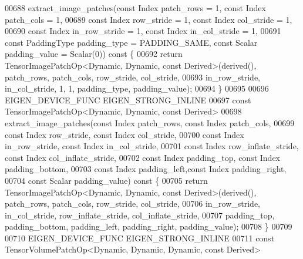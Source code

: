 \begin{DoxyCode}
00688     extract\_image\_patches(\textcolor{keyword}{const} Index patch\_rows = 1, \textcolor{keyword}{const} Index patch\_cols = 1,
00689                           \textcolor{keyword}{const} Index row\_stride = 1, \textcolor{keyword}{const} Index col\_stride = 1,
00690                           \textcolor{keyword}{const} Index in\_row\_stride = 1, \textcolor{keyword}{const} Index in\_col\_stride = 1,
00691                           \textcolor{keyword}{const} PaddingType padding\_type = PADDING\_SAME, \textcolor{keyword}{const} Scalar padding\_value = 
      Scalar(0))\textcolor{keyword}{ const }\{
00692       \textcolor{keywordflow}{return} TensorImagePatchOp<Dynamic, Dynamic, const Derived>(derived(), patch\_rows, patch\_cols, 
      row\_stride, col\_stride,
00693                                                                  in\_row\_stride, in\_col\_stride, 1, 1, 
      padding\_type, padding\_value);
00694     \}
00695 
00696     EIGEN\_DEVICE\_FUNC EIGEN\_STRONG\_INLINE
00697     \textcolor{keyword}{const} TensorImagePatchOp<Dynamic, Dynamic, const Derived>
00698     extract\_image\_patches(\textcolor{keyword}{const} Index patch\_rows, \textcolor{keyword}{const} Index patch\_cols,
00699                           \textcolor{keyword}{const} Index row\_stride, \textcolor{keyword}{const} Index col\_stride,
00700                           \textcolor{keyword}{const} Index in\_row\_stride, \textcolor{keyword}{const} Index in\_col\_stride,
00701                           \textcolor{keyword}{const} Index row\_inflate\_stride, \textcolor{keyword}{const} Index col\_inflate\_stride,
00702                           \textcolor{keyword}{const} Index padding\_top, \textcolor{keyword}{const} Index padding\_bottom,
00703                           \textcolor{keyword}{const} Index padding\_left,\textcolor{keyword}{const} Index padding\_right,
00704                           \textcolor{keyword}{const} Scalar padding\_value)\textcolor{keyword}{ const }\{
00705       \textcolor{keywordflow}{return} TensorImagePatchOp<Dynamic, Dynamic, const Derived>(derived(), patch\_rows, patch\_cols, 
      row\_stride, col\_stride,
00706                                                                  in\_row\_stride, in\_col\_stride, 
      row\_inflate\_stride, col\_inflate\_stride,
00707                                                                  padding\_top, padding\_bottom, padding\_left,
       padding\_right, padding\_value);
00708     \}
00709 
00710     EIGEN\_DEVICE\_FUNC EIGEN\_STRONG\_INLINE
00711     \textcolor{keyword}{const} TensorVolumePatchOp<Dynamic, Dynamic, Dynamic, const Derived>

\end{DoxyCode}
